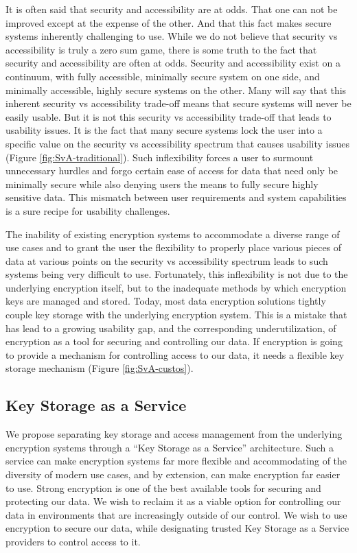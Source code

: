 It is often said that security and accessibility are at odds. That one
can not be improved except at the expense of the other. And that this
fact makes secure systems inherently challenging to use. While we do
not believe that security vs accessibility is truly a zero sum game,
there is some truth to the fact that security and accessibility are
often at odds. Security and accessibility exist on a continuum, with
fully accessible, minimally secure system on one side, and minimally
accessible, highly secure systems on the other. Many will say that
this inherent security vs accessibility trade-off means that secure
systems will never be easily usable. But it is not this security vs
accessibility trade-off that leads to usability issues. It is the fact
that many secure systems lock the user into a specific value on the
security vs accessibility spectrum that causes usability issues
(Figure \ref{fig:SvA-traditional}). Such inflexibility forces a user to
surmount unnecessary hurdles and forgo certain ease of access for data
that need only be minimally secure while also denying users the means
to fully secure highly sensitive data. This mismatch between user
requirements and system capabilities is a sure recipe for usability
challenges.

The inability of existing encryption systems to accommodate a diverse
range of use cases and to grant the user the flexibility to properly
place various pieces of data at various points on the security vs
accessibility spectrum leads to such systems being very difficult to
use. Fortunately, this inflexibility is not due to the underlying
encryption itself, but to the inadequate methods by which encryption
keys are managed and stored. Today, most data encryption solutions
tightly couple key storage with the underlying encryption system. This
is a mistake that has lead to a growing usability gap, and the
corresponding underutilization, of encryption as a tool for securing
and controlling our data. If encryption is going to provide a
mechanism for controlling access to our data, it needs a flexible key
storage mechanism (Figure \ref{fig:SvA-custos}).

\subsection{Key Storage as a Service}

We propose separating key storage and access management from the
underlying encryption systems through a ``Key Storage as a Service''
architecture. Such a service can make encryption systems far more
flexible and accommodating of the diversity of modern use cases, and
by extension, can make encryption far easier to use. Strong encryption
is one of the best available tools for securing and protecting our
data. We wish to reclaim it as a viable option for controlling our
data in environments that are increasingly outside of our control. We
wish to use encryption to secure our data, while designating trusted
Key Storage as a Service providers to control access to it.


